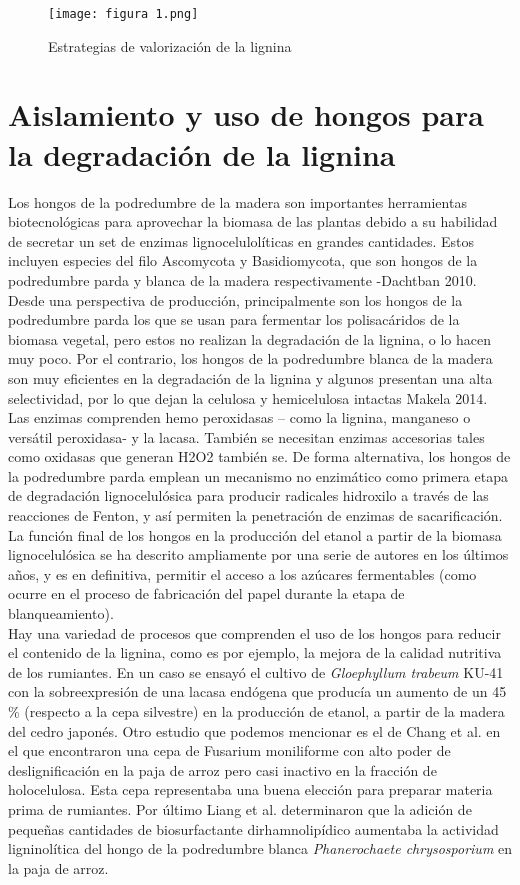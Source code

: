 \documentclass[final,a4paper,times,3p,onecolumn]{elsarticle}
\begin{document}
\begin{figure}
	\centering
	\texttt{[image: figura 1.png]}
	\caption{Estrategias de valorización de la lignina}
	\label{Fig. 1}
\end{figure}
\section{Aislamiento y uso de hongos para la degradación de la lignina}
Los hongos de la podredumbre de la madera son importantes herramientas biotecnológicas para aprovechar la biomasa de las plantas debido a su habilidad de secretar un set de enzimas lignocelulolíticas en grandes cantidades. Estos incluyen especies del filo Ascomycota y Basidiomycota, que son hongos de la podredumbre parda  y blanca de la madera respectivamente -Dachtban 2010. Desde una perspectiva de producción, principalmente son los hongos de la podredumbre parda los que se usan para fermentar los polisacáridos de la biomasa vegetal, pero estos no realizan la degradación de la lignina, o lo hacen muy poco. Por el contrario, los hongos de la podredumbre blanca de la madera son muy eficientes en la degradación de la lignina y algunos presentan una alta selectividad, por lo que dejan la celulosa y hemicelulosa intactas Makela 2014. Las enzimas comprenden hemo peroxidasas – como la lignina, manganeso o versátil peroxidasa- y la lacasa. También se necesitan enzimas accesorias tales como oxidasas que generan H2O2 también se. De forma alternativa, los hongos de la podredumbre parda emplean un mecanismo no enzimático como primera etapa de degradación lignocelulósica para producir radicales hidroxilo a través de las reacciones de Fenton, y así permiten la penetración de enzimas de sacarificación. La función final de los hongos en la producción del etanol a partir de la biomasa lignocelulósica se ha descrito ampliamente por una serie de autores en los últimos años, y es en definitiva, permitir el acceso a los azúcares fermentables (como ocurre en el proceso de fabricación del papel durante la etapa de blanqueamiento). \\
 
Hay una variedad de procesos que comprenden el uso de los hongos para reducir el contenido de la lignina, como es por ejemplo, la mejora de la calidad nutritiva de los rumiantes. En un caso se ensayó el cultivo de \textit{Gloephyllum trabeum} KU-41 con la sobreexpresión de una lacasa endógena que producía un aumento de un 45 \% (respecto a la cepa silvestre) en la producción de etanol, a partir de la madera del cedro japonés. 
Otro estudio que podemos mencionar es el de Chang et al. en el que encontraron una cepa de Fusarium moniliforme con alto poder de deslignificación en la paja de arroz pero casi inactivo en la fracción de holocelulosa. Esta cepa representaba una buena elección para preparar materia prima de rumiantes. Por último Liang et al. determinaron que la adición de pequeñas cantidades de biosurfactante dirhamnolipídico aumentaba la actividad ligninolítica del hongo de la podredumbre blanca \textit{Phanerochaete chrysosporium} en la paja de arroz.
\end{document}
